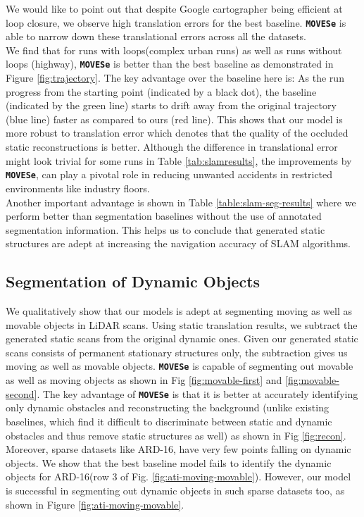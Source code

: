 \documentclass[10pt,twocolumn,letterpaper]{article}
\newcommand{\dslr}{\texttt{\textbf{MOVESe}}}
\begin{document}
We would like to point out that despite Google cartographer being efficient at loop closure, we observe high translation errors for the best baseline.
\dslr{} is able to narrow down these translational errors across all the datasets.\\
We find that for runs with loops(complex urban runs) as well as runs without loops (highway), \dslr{} is better than the best baseline as demonstrated in Figure \ref{fig:trajectory}. The key advantage over the baseline here is: As the run progress from the starting point (indicated by a black dot), the baseline (indicated by the green line) starts to drift away from the original trajectory (blue line) faster as compared to ours (red line). This shows that our model is more robust to translation error which denotes that the quality of the occluded static reconstructions is better. Although the difference in translational error might look trivial for some runs in Table \ref{tab:slamresults}, the improvements by \dslr{}, can play a pivotal role in reducing unwanted accidents in restricted environments like industry floors.\\
Another important advantage is shown in Table \ref{table:slam-seg-results} where we perform better than segmentation baselines without the use of annotated segmentation information. This helps us to conclude that generated static structures are adept at increasing the navigation accuracy of SLAM algorithms.

\subsection{Segmentation of Dynamic Objects}

\label{sec:segm_mova_movi}
We qualitatively show that our models is adept at segmenting moving as well as movable objects in LiDAR scans. Using static translation results, we subtract the generated static scans from the original dynamic ones. Given our generated static scans consists of permanent stationary structures only, the subtraction gives us moving as well as movable objects. \dslr{} is capable of segmenting out movable as well as moving objects as shown in Fig \ref{fig:movable-first} and  \ref{fig:movable-second}. The key advantage of \dslr{} is that it is better at accurately identifying only dynamic obstacles and reconstructing the background (unlike existing baselines, which find it difficult to discriminate between static and dynamic obstacles and thus remove static structures as well) as shown in Fig \ref{fig:recon}. 
Moreover, sparse datasets like ARD-16, have very few points falling on dynamic objects. We show that the best baseline model fails to identify the dynamic objects for ARD-16(row 3 of Fig. \ref{fig:ati-moving-movable}). However, our model is successful in segmenting out dynamic objects in such sparse datasets too, as shown in Figure \ref{fig:ati-moving-movable}.
\end{document}
